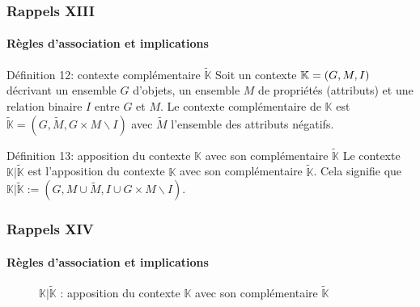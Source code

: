 \documentclass[french]{beamer}
\def\KK{\mathbb{K}}
\def\KKn{\tilde{\mathbb{K}}}
\def\KKc{\mathbb{K}|\tilde{\mathbb{K}}}
\begin{document}
\begin{frame}
\frametitle{Rappels XIII}
\framesubtitle{Règles d'association et implications}
\begin{block}{Définition 12: contexte complémentaire  $\KKn$}
Soit un contexte $\KK = \GMI$ décrivant un ensemble $G$ d’objets, un ensemble $M$ de propriétés (attributs) et une relation binaire $I$ entre $G$ et $M$. Le contexte complémentaire de $\KK$ est $\KKn = (G, \tilde{M}, G \times M \backslash I)$ avec $\tilde{M}$ l'ensemble des attributs négatifs.
\end{block}
\begin{block}{Définition 13: apposition du contexte $\KK$ avec son complémentaire $\KKn$}
Le contexte $\KKc$ est l'apposition du contexte $\KK$ avec son complémentaire $\KKn$. Cela signifie que $\KKc:= (G, M \cup \tilde{M}, I \cup G \times M \backslash I)$.
\end{block}
\end{frame}

\begin{frame}
\frametitle{Rappels XIV}
\framesubtitle{Règles d'association et implications}
\begin{figure}[h]
\label{cap:fig:negctx}
\begin{center}
\begin{cxt}%
\cxtName{}%
%
%
%
%
%
%
%
%
%
%
%
%
\end{cxt}
\end{center}
\caption{$\mathbb{K}|\tilde{\mathbb{K}}$ : apposition du contexte $\KK$ avec son complémentaire $\KKn$}
\end{figure}
\end{frame}
\end{document}
